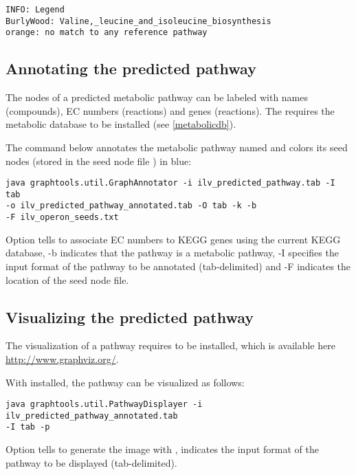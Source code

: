 \begin{lstlisting}
INFO: Legend
BurlyWood: Valine,_leucine_and_isoleucine_biosynthesis
orange: no match to any reference pathway
\end{lstlisting}

\subsection{Annotating the predicted pathway}

The nodes of a predicted metabolic pathway can be labeled with names
(compounds), EC numbers (reactions) and genes (reactions). 
The requires the metabolic database to be installed (see
\ref{metabolicdb}).

The command below annotates the metabolic pathway named
 and colors its seed
nodes (stored in the seed node file  ) in blue:

\begin{verbatim}
java graphtools.util.GraphAnnotator -i ilv_predicted_pathway.tab -I tab 
-o ilv_predicted_pathway_annotated.tab -O tab -k -b 
-F ilv_operon_seeds.txt
\end{verbatim}

Option  tells  to associate EC numbers to
KEGG genes using the current KEGG database, {-b} indicates that the pathway is a metabolic
pathway, {-I} specifies the input format of the pathway to be annotated
(tab-delimited) and {-F} indicates the location of the seed node file.

\subsection{Visualizing the predicted pathway}

The visualization of a pathway requires  to be installed,
which is available here \url{http://www.graphviz.org/}.

With  installed, the pathway can be visualized as follows:

\begin{verbatim}
java graphtools.util.PathwayDisplayer -i ilv_predicted_pathway_annotated.tab 
-I tab -p
\end{verbatim}

Option  tells  to generate the image with
,  indicates the input format of the pathway to be
displayed (tab-delimited).

